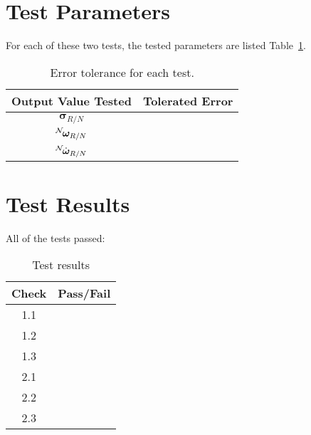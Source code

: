 \section{Test Parameters}
For each of these two tests, the tested parameters are listed Table~\ref{tab:errortol}. 
\begin{table}[htbp]
	\caption{Error tolerance for each test.}
	\label{tab:errortol}
	\centering \fontsize{10}{10}\selectfont
	\begin{tabular}{ c | c } %
		\hline\hline
		\textbf{Output Value Tested}  & \textbf{Tolerated Error}  \\ 
		\hline
		$\bm\sigma_{R/N}$     		        	     &   \\ 
		$\leftexp{N}{\bm\omega_{R/N}}$            &   \\ 
		$\leftexp{N}{\dot{\bm \omega}_{R/N}}$   & \\ 
		\hline\hline
	\end{tabular}
\end{table}




\section{Test Results}

All of the tests passed:
\begin{table}[H]
	\caption{Test results}
	\label{tab:results}
	\centering \fontsize{10}{10}\selectfont
	\begin{tabular}{c | c  } %
		\hline\hline
		\textbf{Check} 						  		&\textbf{Pass/Fail} \\ 
		\hline
	   1.1	   			&  \\ 
	   1.2	   			&  \\ 
	   1.3	   			&  \\ 
	   2.1	   			&  \\ 
	   2.2	   			&  \\ 
	   2.3	   			&  \\ 
	   \hline\hline
	\end{tabular}
\end{table}



